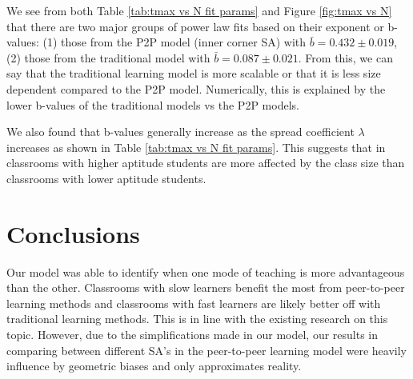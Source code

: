\documentclass[10pt,a4paper,twoside]{article}
\begin{document}
\noindent We see from both Table \ref{tab:tmax vs N fit params} and Figure \ref{fig:tmax vs N} that there are two major groups of power law fits based on their exponent or b-values: (1) those from the P2P model (inner corner SA) with $\bar{b} = 0.432 \pm 0.019$, (2) those from the traditional model with $\bar{b}=0.087\pm0.021$. From this, we can say that the traditional learning model is more scalable or that it is less size dependent compared to the P2P model. Numerically, this is explained by the lower b-values of the traditional models vs the P2P models. 

\noindent We also found that b-values generally increase as the spread coefficient $\lambda$ increases as shown in Table \ref{tab:tmax vs N fit params}. This suggests that in classrooms with higher aptitude students are more affected by the class size than classrooms with lower aptitude students.


\section{Conclusions}
Our model was able to identify when one mode of teaching is more advantageous than the other. Classrooms with slow learners benefit the most from peer-to-peer learning methods and classrooms with fast learners are likely better off with traditional learning methods. This is in line with the existing research on this topic. However, due to the simplifications made in our model, our results in comparing between different SA's in the peer-to-peer learning model were heavily influence by geometric biases and only approximates reality. 



\end{document}
